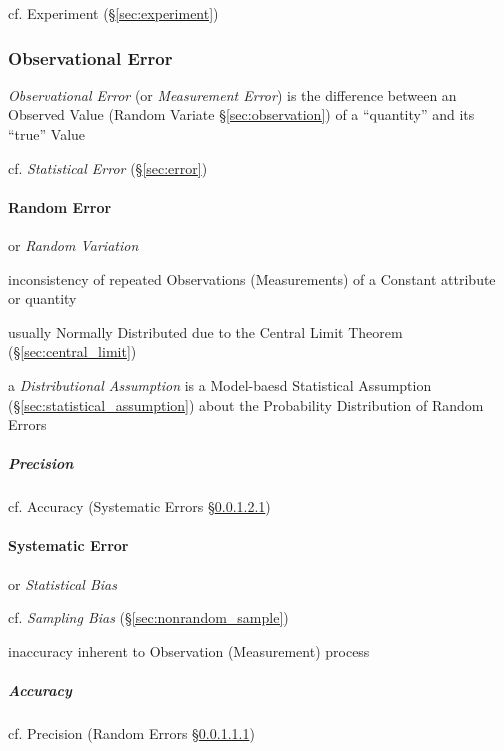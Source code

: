 
cf. Experiment (\S\ref{sec:experiment})



\subsubsection{Observational Error}\label{sec:observational_error}

\emph{Observational Error} (or \emph{Measurement Error}) is the difference
between an Observed Value (Random Variate \S\ref{sec:observation}) of a
``quantity'' and its ``true'' Value

cf. \emph{Statistical Error} (\S\ref{sec:error})



\paragraph{Random Error}\label{sec:random_error}\hfill

or \emph{Random Variation}

inconsistency of repeated Observations (Measurements) of a Constant attribute or
quantity

usually Normally Distributed due to the Central Limit Theorem
(\S\ref{sec:central_limit})

\fist a \emph{Distributional Assumption} is a Model-baesd Statistical Assumption
(\S\ref{sec:statistical_assumption}) about the Probability Distribution of
Random Errors



\subparagraph{Precision}\label{sec:precision}\hfill

cf. Accuracy (Systematic Errors \S\ref{sec:accuracy})



\paragraph{Systematic Error}\label{sec:systematic_error}\hfill

or \emph{Statistical Bias}

cf. \emph{Sampling Bias} (\S\ref{sec:nonrandom_sample})

inaccuracy inherent to Observation (Measurement) process



\subparagraph{Accuracy}\label{sec:accuracy}\hfill

cf. Precision (Random Errors \S\ref{sec:precision})

